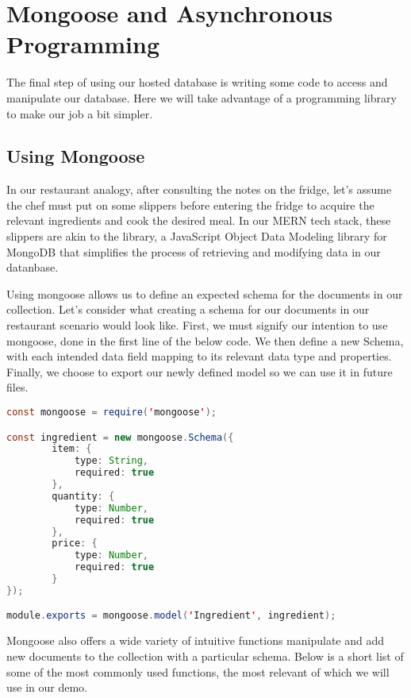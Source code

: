 \section{Mongoose and Asynchronous Programming}

The final step of using our hosted database is writing some code to access and manipulate our database. Here we will take advantage of a programming library to make our job a bit simpler. 

\subsection{Using Mongoose}

In our restaurant analogy, after consulting the notes on the fridge, let's assume the chef must put on some slippers before entering the fridge to acquire the relevant ingredients and cook the desired meal. In our MERN tech stack, these slippers are akin to the  library, a JavaScript Object Data Modeling library for MongoDB that simplifies the process of retrieving and modifying data in our datanbase. 

Using mongoose allows us to define an expected schema for the documents in our collection. Let's consider what creating a schema for our documents in our restaurant scenario would look like. First, we must signify our intention to use mongoose, done in the first line of the below code. We then define a new Schema, with each intended data field mapping to its relevant data type and properties. Finally, we choose to export our newly defined model so we can use it in future files.

\vspace{.5cm}

\begin{lstlisting}[language=Java]
const mongoose = require('mongoose');

const ingredient = new mongoose.Schema({
        item: {
            type: String,
            required: true
        },
        quantity: {
            type: Number,
            required: true
        },
        price: {
            type: Number,
            required: true
        }
});

module.exports = mongoose.model('Ingredient', ingredient);
\end{lstlisting}

Mongoose also offers a wide variety of intuitive functions manipulate and add new documents to the collection with a particular schema. Below is a short list of some of the most commonly used functions, the most relevant of which we will use in our demo.

